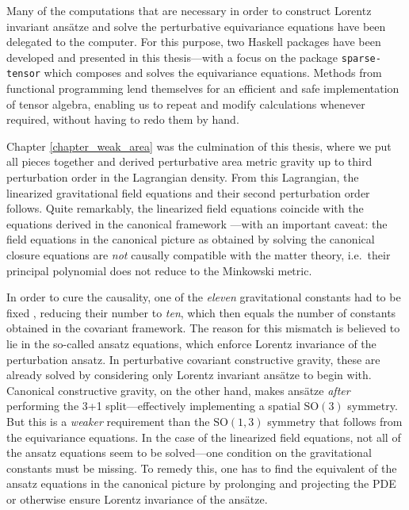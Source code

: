 Many of the computations that are necessary in order to construct Lorentz invariant ansätze and solve the perturbative equivariance equations have been delegated to the computer. For this purpose, two Haskell packages have been developed and presented in this thesis---with a focus on the package \texttt{sparse-tensor} which composes and solves the equivariance equations. Methods from functional programming lend themselves for an efficient and safe implementation of tensor algebra, enabling us to repeat and modify calculations whenever required, without having to redo them by hand.

Chapter \ref{chapter_weak_area} was the culmination of this thesis, where we put all pieces together and derived perturbative area metric gravity up to third perturbation order in the Lagrangian density. From this Lagrangian, the linearized gravitational field equations and their second perturbation order follows. Quite remarkably, the linearized field equations coincide with the equations derived in the canonical framework \cite{Schneider_2017,Alex_2019}---with an important caveat: the field equations in the canonical picture as obtained by solving the canonical closure equations \cite{D_ll_2018,Schneider_2017} are \emph{not} causally compatible with the matter theory, i.e.\ their principal polynomial does not reduce to the Minkowski metric.

In order to cure the causality, one of the \emph{eleven} gravitational constants had to be fixed \cite{Alex_2019}, reducing their number to \emph{ten}, which then equals the number of constants obtained in the covariant framework. The reason for this mismatch is believed to lie in the so-called ansatz equations, which enforce Lorentz invariance of the perturbation ansatz. In perturbative covariant constructive gravity, these are already solved by considering only Lorentz invariant ansätze to begin with. Canonical constructive gravity, on the other hand, makes ansätze \emph{after} performing the 3+1 split---effectively implementing a spatial $\mathrm{SO}(3)$ symmetry. But this is a \emph{weaker} requirement than the $\mathrm{SO}(1,3)$ symmetry that follows from the equivariance equations. In the case of the linearized field equations, not all of the ansatz equations seem to be solved---one condition on the gravitational constants must be missing. To remedy this, one has to find the equivalent of the ansatz equations in the canonical picture by prolonging and projecting the PDE or otherwise ensure Lorentz invariance of the ansätze.


